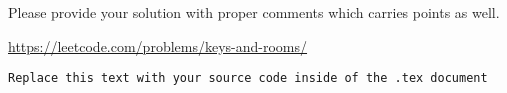 \documentclass[12pt]{article}
\begin{document}
\begin{enumerate}
{    Please provide your solution with proper comments which carries points as well.}
    
   \url{https://leetcode.com/problems/keys-and-rooms/}

\begin{verbatim}
Replace this text with your source code inside of the .tex document
\end{verbatim}	
	
	
\end{enumerate}
\end{document}
